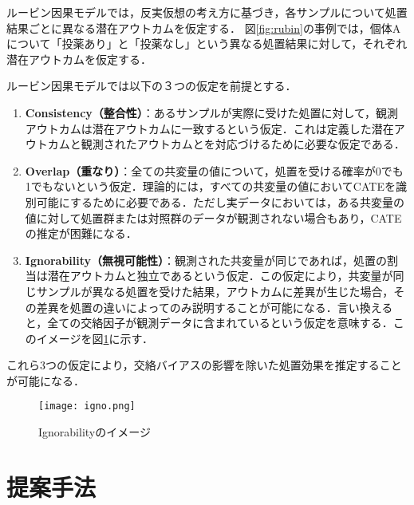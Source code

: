 \documentclass[dvipdfmx]{jreport}
\begin{document}
ルービン因果モデルでは，反実仮想の考え方に基づき，各サンプルについて処置結果ごとに異なる潜在アウトカムを仮定する．
図\ref{fig:rubin}の事例では，個体Aについて「投薬あり」と「投薬なし」という異なる処置結果に対して，それぞれ潜在アウトカムを仮定する．

ルービン因果モデルでは以下の３つの仮定を前提とする．
\begin{tcolorbox}[title=\textbf{ルービン因果モデルの仮定}]
    \begin{enumerate}
        \item \textbf{Consistency（整合性）}：あるサンプルが実際に受けた処置に対して，観測アウトカムは潜在アウトカムに一致するという仮定．これは定義した潜在アウトカムと観測されたアウトカムとを対応づけるために必要な仮定である．
        \item \textbf{Overlap（重なり）}：全ての共変量の値について，処置を受ける確率が0でも1でもないという仮定．理論的には，すべての共変量の値においてCATEを識別可能にするために必要である．ただし実データにおいては，ある共変量の値に対して処置群または対照群のデータが観測されない場合もあり，CATEの推定が困難になる．
        \item \textbf{Ignorability（無視可能性）}：観測された共変量が同じであれば，処置の割当は潜在アウトカムと独立であるという仮定．この仮定により，共変量が同じサンプルが異なる処置を受けた結果，アウトカムに差異が生じた場合，その差異を処置の違いによってのみ説明することが可能になる．言い換えると，全ての交絡因子が観測データに含まれているという仮定を意味する．このイメージを図\ref{fig:igno}に示す．
    \end{enumerate}
\end{tcolorbox}

これら3つの仮定により，交絡バイアスの影響を除いた処置効果を推定することが可能になる．

\begin{figure}[h]
    \begin{center}
        \texttt{[image: igno.png]} 
        \caption{Ignorabilityのイメージ} \label{fig:igno}
    \end{center}
\end{figure}


\section{提案手法}
\end{document}
